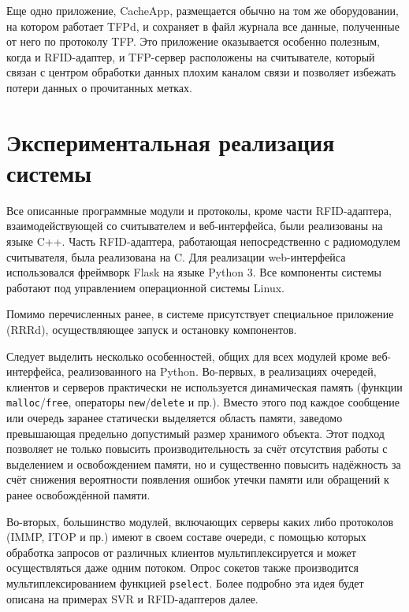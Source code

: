 Еще одно приложение, CacheApp, размещается обычно на том же оборудовании, на котором работает TFPd, и сохраняет в файл журнала все данные, полученные от него по протоколу TFP. Это приложение оказывается особенно полезным, когда и RFID-адаптер, и TFP-сервер расположены на считывателе, который связан с центром обработки данных плохим каналом связи и позволяет избежать потери данных о прочитанных метках.



\section{Экспериментальная реализация системы}\label{sec:ch5_implementation}

Все описанные программные модули и протоколы, кроме части RFID-адаптера, взаимодействующей со считывателем и веб-интерфейса, были реализованы на языке C++. Часть RFID-адаптера, работающая непосредственно с радиомодулем считывателя, была реализована на C. Для реализации web-интерфейса использовался фреймворк Flask на языке Python 3. Все компоненты системы работают под управлением операционной системы Linux.

Помимо перечисленных ранее, в системе присутствует специальное приложение (RRRd), осуществляющее запуск и остановку компонентов.

Следует выделить несколько особенностей, общих для всех модулей кроме веб-интерфейса, реализованного на Python. Во-первых, в реализациях очередей, клиентов и серверов практически не используется динамическая память (функции \texttt{malloc}/\texttt{free}, операторы \texttt{new}/\texttt{delete} и пр.). Вместо этого под каждое сообщение или очередь заранее статически выделяется область памяти, заведомо превышающая предельно допустимый размер хранимого объекта. Этот подход позволяет не только повысить производительность за счёт отсутствия работы с выделением и освобождением памяти, но и существенно повысить надёжность за счёт снижения вероятности появления ошибок утечки памяти или обращений к ранее освобождённой памяти.

Во-вторых, большинство модулей, включающих серверы каких либо протоколов (IMMP, ITOP и пр.) имеют в своем составе очереди, с помощью которых обработка запросов от различных клиентов мультиплексируется и может осуществляться даже одним потоком. Опрос сокетов также производится мультиплексированием функцией \texttt{pselect}. Более подробно эта идея будет описана на примерах SVR и RFID-адаптеров далее.

